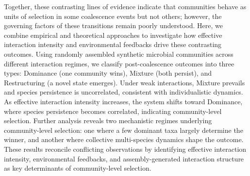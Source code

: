 Together, these contrasting lines of evidence indicate that communities behave as units of selection in some coalescence events but not others; however, the governing factors of these transitions remain poorly understood. Here, we combine empirical and theoretical approaches to investigate how effective interaction intensity and environmental feedbacks drive these contrasting outcomes. Using randomly assembled synthetic microbial communities across different interaction regimes, we classify post-coalescence outcomes into three types: Dominance (one community wins), Mixture (both persist), and Restructuring (a novel state emerges). Under weak interactions, Mixture prevails and species persistence is uncorrelated, consistent with individualistic dynamics. As effective interaction intensity increases, the system shifts toward Dominance, where species persistence becomes correlated, indicating community-level selection.  Further analysis reveals two mechanistic regimes underlying community-level selection: one where a few dominant taxa largely determine the winner, and another where collective multi-species dynamics shape the outcome. These results reconcile conflicting observations by identifying effective interaction intensity, environmental feedbacks, and assembly-generated interaction structure as key determinants of community-level selection.
